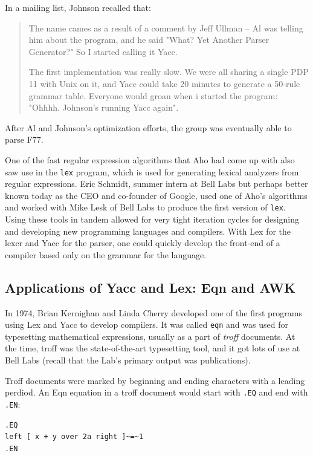 In a mailing list, Johnson recalled that:
\begin{quotation}
	The name cames as a result of a comment by Jeff Ullman -- Al was
	telling him about the program,
	and he said "What? Yet Another Parser Generator?"
	So I started calling it Yacc.

	The first implementation was really slow.  We were all sharing a
	single PDP 11 with Unix on it, and
	Yacc could take 20 minutes to generate a 50-rule grammar table.
	Everyone would groan when  i
	started the program: "Ohhhh.  Johnson's running Yacc again".
\end{quotation}

After Al and Johnson's optimization efforts, the group was eventually able to
parse \Gls{F77}.

One of the fast regular expression algorithms that Aho had come up with also saw use in the
\texttt{lex} program, which is used for generating lexical analyzers from regular expressions.
Eric Schmidt, summer intern at Bell Labs but perhaps better known today as the
CEO and co-founder of Google, used one of Aho's algorithms and worked with Mike Lesk of Bell Labs
to produce the first version of \texttt{lex}.
Using these tools in tandem allowed for very tight iteration cycles for designing and
developing new programming languages and compilers. With Lex for the lexer and Yacc for the parser,
one could quickly develop the front-end of a compiler based only on the grammar for the language.

\subsection{Applications of Yacc and Lex: Eqn and AWK}

In 1974, Brian Kernighan and Linda Cherry developed one of the first programs
using Lex and Yacc to develop compilers.
It was called \texttt{eqn} and was used for typesetting mathematical expressions,
usually as a part of \textit{troff} documents.
At the time, troff was the state-of-the-art typesetting tool,
and it got lots of use at Bell Labs (recall that the Lab's primary output was publications).

Troff documents were marked by beginning and ending characters with a leading perdiod.
An Eqn equation in a troff document would start with \texttt{.EQ} and end with \texttt{.EN}\cite{kernighan_cherry_eqn_1975}:

\begin{lstlisting}[frame=single]
.EQ
left [ x + y over 2a right ]~=~1
.EN
\end{lstlisting}

